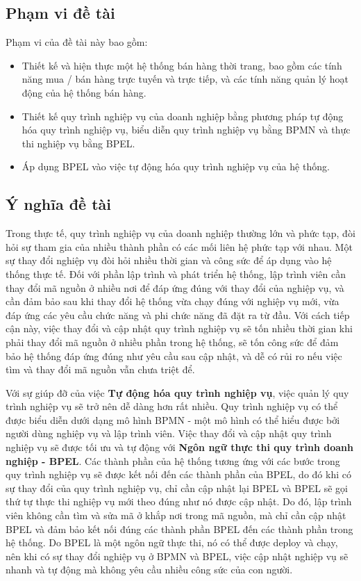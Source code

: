 \subsection{Phạm vi đề tài}
\par Phạm vi của đề tài này bao gồm:
\begin{itemize}
	\item Thiết kế và hiện thực một hệ thống bán hàng thời trang, bao gồm các tính năng mua / bán hàng trực tuyến và trực tiếp, và các tính năng quản lý hoạt động của hệ thống bán hàng.
	\item Thiết kế quy trình nghiệp vụ của doanh nghiệp bằng phương pháp tự động hóa quy trình nghiệp vụ, biểu diễn quy trình nghiệp vụ bằng BPMN và thực thi nghiệp vụ bằng BPEL.
	\item Áp dụng BPEL vào việc tự động hóa quy trình nghiệp vụ của hệ thống.
\end{itemize}

\subsection{Ý nghĩa đề tài}
\hspace{0.5cm} Trong thực tế, quy trình nghiệp vụ của doanh nghiệp thường lớn và phức tạp, đòi hỏi sự tham gia của nhiều thành phần có các mối liên hệ phức tạp với nhau. Một sự thay đổi nghiệp vụ đòi hỏi nhiều thời gian và công sức để áp dụng vào hệ thống thực tế. Đối với phần lập trình và phát triển hệ thống, lập trình viên cần thay đổi mã nguồn ở nhiều nơi để đáp ứng đúng với thay đổi của nghiệp vụ, và cần đảm bảo sau khi thay đổi hệ thống vừa chạy đúng với nghiệp vụ mới, vừa đáp ứng các yêu cầu chức năng và phi chức năng đã đặt ra từ đầu. Với cách tiếp cận này, việc thay đổi và cập nhật quy trình nghiệp vụ sẽ tốn nhiều thời gian khi phải thay đổi mã nguồn ở nhiều phần trong hệ thống, sẽ tốn công sức để đảm bảo hệ thống đáp ứng đúng như yêu cầu sau cập nhật, và dễ có rủi ro nếu việc tìm và thay đổi mã nguồn vẫn chưa triệt để.

\par Với sự giúp đỡ của việc \textbf{Tự động hóa quy trình nghiệp vụ}, việc quản lý quy trình nghiệp vụ sẽ trở nên dễ dàng hơn rất nhiều. Quy trình nghiệp vụ có thể được biểu diễn dưới dạng mô hình BPMN - một mô hình có thể hiểu được bởi người dùng nghiệp vụ và lập trình viên. Việc thay đổi và cập nhật quy trình nghiệp vụ sẽ được tối ưu và tự động với \textbf{Ngôn ngữ thực thi quy trình doanh nghiệp - BPEL}. Các thành phần của hệ thống tương ứng với các bước trong quy trình nghiệp vụ sẽ được kết nối đến các thành phần của BPEL, do đó khi có sự thay đổi của quy trình nghiệp vụ, chỉ cần cập nhật lại BPEL và BPEL sẽ gọi thứ tự thực thi nghiệp vụ mới theo đúng như nó được cập nhật. Do đó, lập trình viên không cần tìm và sửa mã ở khắp nơi trong mã nguồn, mà chỉ cần cập nhật BPEL và đảm bảo kết nối đúng các thành phần BPEL đến các thành phần trong hệ thống. Do BPEL là một ngôn ngữ thực thi, nó có thể được deploy và chạy, nên khi có sự thay đổi nghiệp vụ ở BPMN và BPEL, việc cập nhật nghiệp vụ sẽ nhanh và tự động mà không yêu cầu nhiều công sức của con người.

